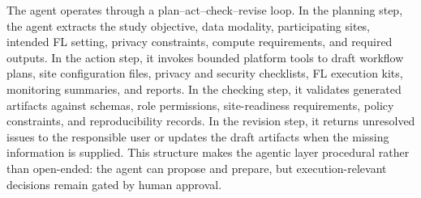 \documentclass[preprint,5p, 10pt, times]{elsarticle}
\begin{document}
The agent operates through a plan--act--check--revise loop. 
In the planning step, the agent extracts the study objective, data modality, participating sites, intended FL setting, privacy constraints, compute requirements, and required outputs. 
In the action step, it invokes bounded platform tools to draft workflow plans, site configuration files, privacy and security checklists, FL execution kits, monitoring summaries, and reports. 
In the checking step, it validates generated artifacts against schemas, role permissions, site-readiness requirements, policy constraints, and reproducibility records. 
In the revision step, it returns unresolved issues to the responsible user or updates the draft artifacts when the missing information is supplied. 
This structure makes the agentic layer procedural rather than open-ended: the agent can propose and prepare, but execution-relevant decisions remain gated by human approval.
\end{document}
